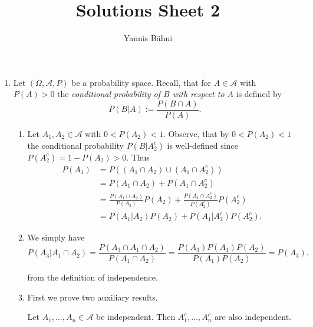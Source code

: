 

\title{Solutions Sheet 2}
\author{Yannis B\"{a}hni}
\address[Yannis B\"{a}hni]{University of Zurich, R\"{a}mistrasse 71, 8006 Zurich}


\maketitle
\thispagestyle{fancy}
\begin{enumerate}[label = \textbf{Exercise \arabic*.},wide = 0pt, itemsep=1.5ex]
	\item Let $(\Omega,\mathcal{A},P)$ be a probability space. Recall, that for $A \in \mathcal{A}$ with $P(A) > 0$ the \emph{conditional probability of $B$ with respect to $A$} is defined by
		\begin{equation}
			P(B \vert A) := \frac{P(B \cap A)}{P(A)}.
		\end{equation}
		\begin{enumerate}[label = \arabic*.,wide = 0pt, itemsep=1.5ex]
			\item Let $A_1,A_2 \in \mathcal{A}$ with $0 < P(A_2) < 1$. Observe, that by $0 < P(A_2) < 1$ the conditional probability $P(B\vert A_2^c)$ is well-defined since $P(A_2^c) = 1 - P(A_2) > 0$. Thus
				\begin{align*}
					P(A_1) &= P((A_1 \cap A_2) \cup (A_1 \cap A_2^c))\\
					&= P(A_1 \cap A_2) + P(A_1 \cap A_2^c)\\
					&= \frac{P(A_1 \cap A_2)}{P(A_2)}P(A_2) + \frac{P(A_1 \cap A_2^c)}{P(A_2^c)}P(A_2^c)\\
					&= P(A_1 \vert A_2)P(A_2) + P(A_1 \vert A_2^c)P(A_2^c).
				\end{align*}

			\item We simply have 
				\begin{equation*}
					P(A_3 \vert A_1 \cap A_2) = \frac{P(A_3 \cap A_1 \cap A_2)}{P(A_1 \cap A_2)} = \frac{P(A_3)P(A_1)P(A_2)}{P(A_1)P(A_2)} = P(A_3).
				\end{equation*}

				\noindent from the definition of independence.

			\item First we prove two auxiliary results. 
				\begin{lemma}
					Let $A_1, \dots,A_n \in \mathcal{A}$ be independent. Then $A_1^c, \dots, A_n^c$ are also independent.
					\label{lem:independence_complements}
				\end{lemma}


\end{enumerate}
\end{enumerate}
